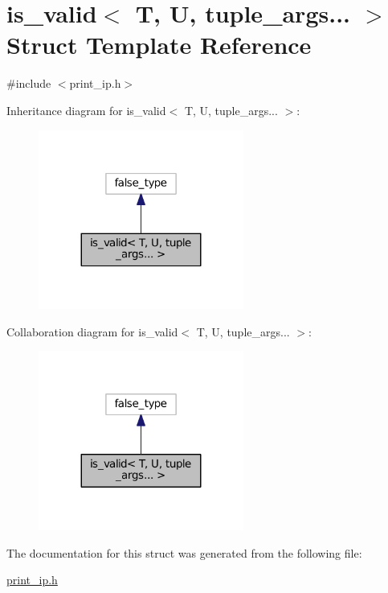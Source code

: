 \hypertarget{structis__valid_3_01T_00_01U_00_01tuple__args_8_8_8_01_4}{}\section{is\+\_\+valid$<$ T, U, tuple\+\_\+args... $>$ Struct Template Reference}
\label{structis__valid_3_01T_00_01U_00_01tuple__args_8_8_8_01_4}


{\ttfamily \#include $<$print\+\_\+ip.\+h$>$}



Inheritance diagram for is\+\_\+valid$<$ T, U, tuple\+\_\+args... $>$\+:
\nopagebreak
\begin{figure}[H]
\begin{center}
\leavevmode
\includegraphics[width=191pt]{structis__valid_3_01T_00_01U_00_01tuple__args_8_8_8_01_4__inherit__graph}
\end{center}
\end{figure}


Collaboration diagram for is\+\_\+valid$<$ T, U, tuple\+\_\+args... $>$\+:
\nopagebreak
\begin{figure}[H]
\begin{center}
\leavevmode
\includegraphics[width=191pt]{structis__valid_3_01T_00_01U_00_01tuple__args_8_8_8_01_4__coll__graph}
\end{center}
\end{figure}


The documentation for this struct was generated from the following file\+:\begin{DoxyCompactItemize}
\item 
\hyperlink{print__ip_8h}{print\+\_\+ip.\+h}\end{DoxyCompactItemize}

